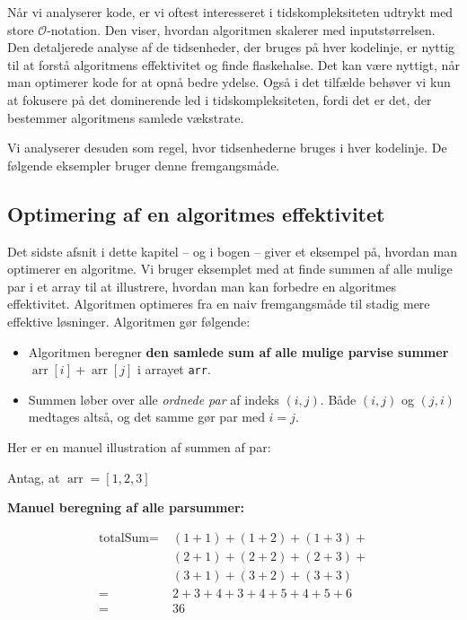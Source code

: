Når vi analyserer kode, er vi oftest interesseret i tidskompleksiteten udtrykt med store $\mathcal{O}$-notation. Den viser, hvordan algoritmen skalerer med inputstørrelsen. Den detaljerede analyse af de tidsenheder, der bruges på hver kodelinje, er nyttig til at forstå algoritmens effektivitet og finde flaskehalse. Det kan være nyttigt, når man optimerer kode for at opnå bedre ydelse. Også i det tilfælde behøver vi kun at fokusere på det dominerende led i tidskompleksiteten, fordi det er det, der bestemmer algoritmens samlede vækstrate.

Vi analyserer desuden som regel, hvor tidsenhederne bruges i hver kodelinje. De følgende eksempler bruger denne fremgangsmåde.

\subsection*{Optimering af en algoritmes effektivitet}
Det sidste afsnit i dette kapitel -- og i bogen -- giver et eksempel på, hvordan man optimerer en algoritme. Vi bruger eksemplet med at finde summen af alle mulige par i et array til at illustrere, hvordan man kan forbedre en algoritmes effektivitet. Algoritmen optimeres fra en naiv fremgangsmåde til stadig mere effektive løsninger. Algoritmen gør følgende:

\begin{itemize}
    \item Algoritmen beregner \textbf{den samlede sum af alle mulige parvise summer} $\operatorname{arr}[i]+\operatorname{arr}[j]$ i arrayet \texttt{arr}.
    \item Summen løber over alle \emph{ordnede par} af indeks $(i,j)$. Både $(i,j)$ og $(j,i)$ medtages altså, og det samme gør par med $i=j$.
\end{itemize}

\begin{example} Her er en manuel illustration af summen af par:

    Antag, at $\operatorname{arr}=[1,2,3]$

   \textbf{ Manuel beregning af alle parsummer:}
    
   \begin{align*}
    \text{totalSum} = & \; (1+1)+(1+2)+(1+3)+ \\
                    & \; (2+1)+(2+2)+(2+3)+ \\
                    & \; (3+1)+(3+2)+(3+3) \\
                    = & \; 2+3+4+3+4+5+4+5+6 \\
                    = & \; 36
    \end{align*}
    
\end{example}


